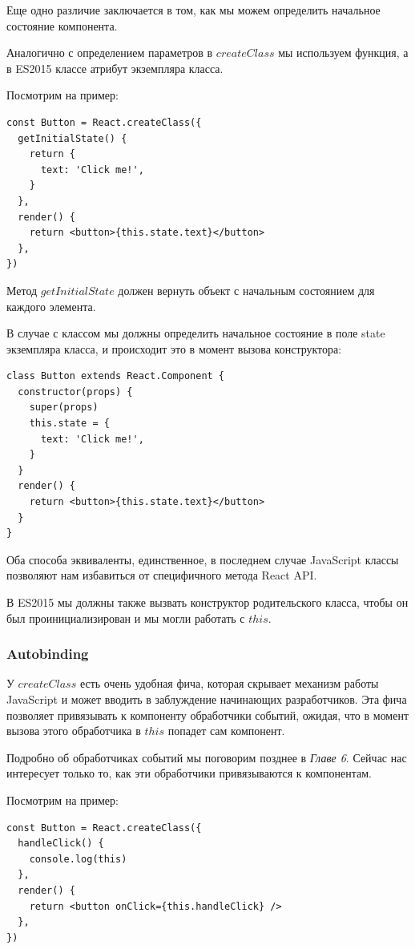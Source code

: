 Еще одно различие заключается в том, как мы можем определить начальное состояние компонента.

Аналогично с определением параметров в $createClass$ мы используем функция, а в ES2015 классе атрибут экземпляра класса.

Посмотрим на пример:

\begin{lstlisting}
const Button = React.createClass({
  getInitialState() {
    return {
      text: 'Click me!',
    } 
  },
  render() {
    return <button>{this.state.text}</button>
  }, 
})
\end{lstlisting}

Метод $getInitialState$ должен вернуть объект с начальным состоянием для каждого элемента.

В случае с классом мы должны определить начальное состояние в поле state экземпляра класса, и происходит это в момент вызова конструктора:

\begin{lstlisting}
class Button extends React.Component {
  constructor(props) {
    super(props)
    this.state = {
      text: 'Click me!',
    }
  }
  render() {
    return <button>{this.state.text}</button>
  } 
}
\end{lstlisting}

Оба способа эквиваленты, единственное, в последнем случае JavaScript классы позволяют нам избавиться от специфичного метода React API.

В ES2015 мы должны также вызвать конструктор родительского класса, чтобы он был проинициализирован и мы могли работать с $this$.

\subsubsection{Autobinding}

У $createClass$ есть очень удобная фича, которая скрывает механизм работы JavaScript и может вводить в заблуждение начинающих разработчиков. Эта фича позволяет привязывать к компоненту обработчики событий, ожидая, что в момент вызова этого обработчика в $this$ попадет сам компонент.

Подробно об обработчиках событий мы поговорим позднее в \textit{Главе 6}. Сейчас нас интересует только то, как эти обработчики привязываются к компонентам.

Посмотрим на пример:

\begin{lstlisting}
const Button = React.createClass({
  handleClick() {
    console.log(this)
  },
  render() {
    return <button onClick={this.handleClick} />
  }, 
})
\end{lstlisting}

